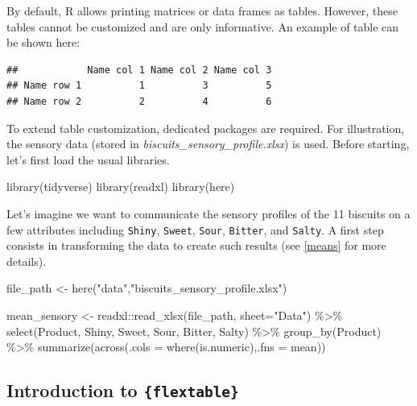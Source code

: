 \documentclass[
]{krantz}
\makeatletter
\newenvironment{Shaded}{\begin{snugshade}}{\end{snugshade}}
\newcommand{\AttributeTok}[1]{\textcolor[rgb]{0.61,0.61,0.61}{#1}}
\newcommand{\FunctionTok}[1]{\textcolor[rgb]{0,0,0}{#1}}
\newcommand{\NormalTok}[1]{#1}
\newcommand{\OtherTok}[1]{\textcolor[rgb]{0.37,0.37,0.37}{#1}}
\newcommand{\SpecialCharTok}[1]{\textcolor[rgb]{0,0,0}{#1}}
\newcommand{\StringTok}[1]{\textcolor[rgb]{0.5,0.5,0.5}{#1}}
\newenvironment{kframe}{%
\medskip{}
\setlength{\fboxsep}{.8em}
 \def\at@end@of@kframe{}%
 \ifinner\ifhmode%
  \def\at@end@of@kframe{\end{minipage}}%
  \begin{minipage}{\columnwidth}%
 \fi\fi%
 \def\FrameCommand##1{\hskip\@totalleftmargin \hskip-\fboxsep
 \colorbox{shadecolor}{##1}\hskip-\fboxsep
     \hskip-\linewidth \hskip-\@totalleftmargin \hskip\columnwidth}%
 \MakeFramed {\advance\hsize-\width
   \@totalleftmargin\z@ \linewidth\hsize
   \@setminipage}}%
 {\par\unskip\endMakeFramed%
 \at@end@of@kframe}
\renewenvironment{Shaded}{\begin{kframe}}{\end{kframe}}
\makeatother
\begin{document}
By default, R allows printing matrices or data frames as tables. However, these tables cannot be customized and are only informative. An example of table can be shown here:

\begin{verbatim}
##            Name col 1 Name col 2 Name col 3
## Name row 1          1          3          5
## Name row 2          2          4          6
\end{verbatim}

To extend table customization, dedicated packages are required. For illustration, the sensory data (stored in \emph{biscuits\_sensory\_profile.xlsx}) is used.
Before starting, let's first load the usual libraries.

\begin{Shaded}
\begin{Highlighting}[]
\FunctionTok{library}\NormalTok{(tidyverse)}
\FunctionTok{library}\NormalTok{(readxl)}
\FunctionTok{library}\NormalTok{(here)}
\end{Highlighting}
\end{Shaded}

Let's imagine we want to communicate the sensory profiles of the 11 biscuits on a few attributes including \texttt{Shiny}, \texttt{Sweet}, \texttt{Sour}, \texttt{Bitter}, and \texttt{Salty}. A first step consists in transforming the data to create such results (see \ref{means} for more details).

\begin{Shaded}
\begin{Highlighting}[]
\NormalTok{file\_path }\OtherTok{\textless{}{-}} \FunctionTok{here}\NormalTok{(}\StringTok{"data"}\NormalTok{,}\StringTok{"biscuits\_sensory\_profile.xlsx"}\NormalTok{) }

\NormalTok{mean\_sensory }\OtherTok{\textless{}{-}}\NormalTok{ readxl}\SpecialCharTok{::}\FunctionTok{read\_xlsx}\NormalTok{(file\_path, }\AttributeTok{sheet=}\StringTok{"Data"}\NormalTok{) }\SpecialCharTok{\%\textgreater{}\%} 
  \FunctionTok{select}\NormalTok{(Product, Shiny, Sweet, Sour, Bitter, Salty) }\SpecialCharTok{\%\textgreater{}\%}
  \FunctionTok{group\_by}\NormalTok{(Product) }\SpecialCharTok{\%\textgreater{}\%}
  \FunctionTok{summarize}\NormalTok{(}\FunctionTok{across}\NormalTok{(}\AttributeTok{.cols =} \FunctionTok{where}\NormalTok{(is.numeric),}\AttributeTok{.fns =}\NormalTok{ mean))}
\end{Highlighting}
\end{Shaded}

\hypertarget{flextable}{%
\subsection{\texorpdfstring{Introduction to \texttt{\{flextable\}}}{Introduction to \{flextable\}}}\label{flextable}}
\end{document}
